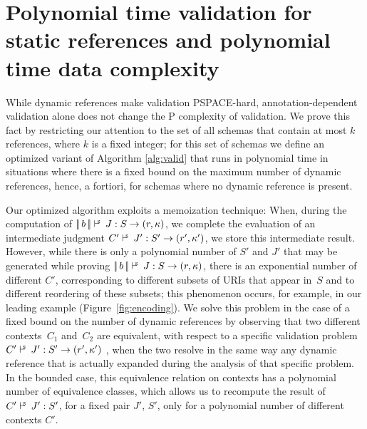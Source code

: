 \section{Polynomial time validation for static references  and polynomial time data complexity}\label{sec:ptime}

While dynamic references make validation PSPACE-hard, annotation-dependent validation alone does not
change the P complexity of  {\cJS} validation. We prove this fact by restricting our attention to the set of all schemas that contain at most $k$ references, where $k$ is a fixed integer; for this set of schemas we define an optimized variant of Algorithm \ref{alg:valid} that runs in polynomial time in situations where
there is a fixed bound on the maximum number of dynamic references, hence, a fortiori, for schemas where no dynamic
reference is present.

Our optimized algorithm exploits a memoization technique: When, during the computation of $\SJudg{\List{b}}{J}{S} \Ret{} (r,\pk)$, we
complete the evaluation of an intermediate judgment $\SJudg{C'}{J'}{S'} \Ret{} (r',\pk')$, we store this intermediate result.
However, while there is only a polynomial number of $S'$ and $J'$ that may be generated while proving $\SJudg{\List{b}}{J}{S} \Ret{} (r,\pk)$,
there is an exponential number of different $C'$, corresponding to different subsets of URIs that appear in~$S$ and to different reordering
of these subsets; this phenomenon occurs, for example, in our leading example (Figure~\ref{fig:encoding}). %
We solve this problem in the case of a fixed bound on the number of dynamic references by observing that two different contexts~$C_1$ and~$C_2$ are equivalent,
with respect to a specific validation problem $\SJudg{C'}{J'}{S'} \Ret{} (r',\pk')$ , when the two resolve in the same way any dynamic reference that is actually
expanded during the analysis of that specific problem. In the bounded case, this equivalence relation on contexts has a polynomial
number of equivalence classes, which allows us to recompute the result of $\SJudg{C'}{J'}{S'}$, for a fixed pair $J'$, $S'$, only for a polynomial number of different contexts $C'$.

